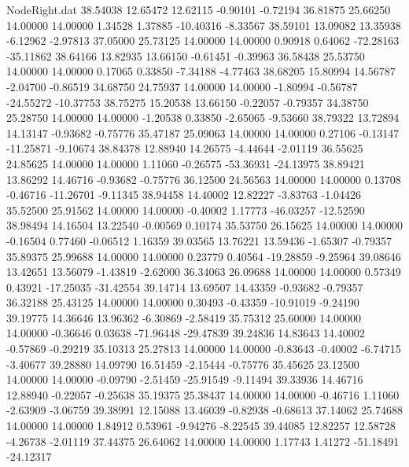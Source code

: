 \begin{filecontents}{NodeRight.dat}
  38.54038   12.65472   12.62115    -0.90101   -0.72194   36.81875   25.66250   14.00000   14.00000    1.34528    1.37885  -10.40316   -8.33567
  38.59101   13.09082   13.35938    -6.12962   -2.97813   37.05000   25.73125   14.00000   14.00000    0.90918    0.64062  -72.28163  -35.11862
  38.64166   13.82935   13.66150    -0.61451   -0.39963   36.58438   25.53750   14.00000   14.00000    0.17065    0.33850   -7.34188   -4.77463
  38.68205   15.80994   14.56787    -2.04700   -0.86519   34.68750   24.75937   14.00000   14.00000   -1.80994   -0.56787  -24.55272  -10.37753
  38.75275   15.20538   13.66150    -0.22057   -0.79357   34.38750   25.28750   14.00000   14.00000   -1.20538    0.33850   -2.65065   -9.53660
  38.79322   13.72894   14.13147    -0.93682   -0.75776   35.47187   25.09063   14.00000   14.00000    0.27106   -0.13147  -11.25871   -9.10674
  38.84378   12.88940   14.26575    -4.44644   -2.01119   36.55625   24.85625   14.00000   14.00000    1.11060   -0.26575  -53.36931  -24.13975
  38.89421   13.86292   14.46716    -0.93682   -0.75776   36.12500   24.56563   14.00000   14.00000    0.13708   -0.46716  -11.26701   -9.11345
  38.94458   14.40002   12.82227    -3.83763   -1.04426   35.52500   25.91562   14.00000   14.00000   -0.40002    1.17773  -46.03257  -12.52590
  38.98494   14.16504   13.22540    -0.00569    0.10174   35.53750   26.15625   14.00000   14.00000   -0.16504    0.77460   -0.06512    1.16359
  39.03565   13.76221   13.59436    -1.65307   -0.79357   35.89375   25.99688   14.00000   14.00000    0.23779    0.40564  -19.28859   -9.25964
  39.08646   13.42651   13.56079    -1.43819   -2.62000   36.34063   26.09688   14.00000   14.00000    0.57349    0.43921  -17.25035  -31.42554
  39.14714   13.69507   14.43359    -0.93682   -0.79357   36.32188   25.43125   14.00000   14.00000    0.30493   -0.43359  -10.91019   -9.24190
  39.19775   14.36646   13.96362    -6.30869   -2.58419   35.75312   25.60000   14.00000   14.00000   -0.36646    0.03638  -71.96448  -29.47839
  39.24836   14.83643   14.40002    -0.57869   -0.29219   35.10313   25.27813   14.00000   14.00000   -0.83643   -0.40002   -6.74715   -3.40677
  39.28880   14.09790   16.51459    -2.15444   -0.75776   35.45625   23.12500   14.00000   14.00000   -0.09790   -2.51459  -25.91549   -9.11494
  39.33936   14.46716   12.88940    -0.22057   -0.25638   35.19375   25.38437   14.00000   14.00000   -0.46716    1.11060   -2.63909   -3.06759
  39.38991   12.15088   13.46039    -0.82938   -0.68613   37.14062   25.74688   14.00000   14.00000    1.84912    0.53961   -9.94276   -8.22545
  39.44085   12.82257   12.58728    -4.26738   -2.01119   37.44375   26.64062   14.00000   14.00000    1.17743    1.41272  -51.18491  -24.12317

\end{filecontents}
